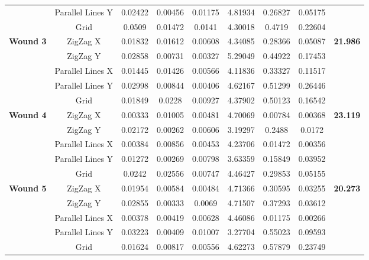 \begin{table}[htbp]
\begin{adjustbox}{width=1.2\textwidth,center=\textwidth}
\begin{tabular}{c|c|c|c|c|c|c|c|c}
         & Parallel Lines Y & 0.02422 & 0.00456 & 0.01175 & 4.81934 & 0.26827 & 0.05175 & \\
         & Grid & 0.0509 & 0.01472 & 0.0141 & 4.30018 & 0.4719 & 0.22604 & \\
         \midrule
         \multirow{5}{*}{\textbf{Wound 3}} & ZigZag X & 0.01832 & 0.01612 & 0.00608 & 4.34085 & 0.28366 & 0.05087 & \multirow{5}{*}{\textbf{21.986}}\\
         & ZigZag Y & 0.02858 & 0.00731 & 0.00327 & 5.29049 & 0.44922 & 0.17453 & \\
         & Parallel Lines X & 0.01445 & 0.01426 & 0.00566 & 4.11836 & 0.33327 & 0.11517 & \\
         & Parallel Lines Y & 0.02998 & 0.00844 & 0.00406 & 4.62167 & 0.51299 & 0.26446 &\\
         & Grid & 0.01849 & 0.0228 & 0.00927 & 4.37902 & 0.50123 & 0.16542 &\\
         \midrule
         \multirow{5}{*}{\textbf{Wound 4}} & ZigZag X & 0.00333 & 0.01005 & 0.00481 & 4.70069 & 0.00784 & 0.00368 & \multirow{5}{*}{\textbf{23.119}}\\
         & ZigZag Y & 0.02172 & 0.00262 & 0.00606 & 3.19297 & 0.2488 & 0.0172 & \\
         & Parallel Lines X & 0.00384 & 0.00856 & 0.00453 & 4.23706 & 0.01472 & 0.00356 & \\
         & Parallel Lines Y & 0.01272 & 0.00269 & 0.00798 & 3.63359 & 0.15849 & 0.03952 & \\
         & Grid & 0.0242 & 0.02556 & 0.00747 & 4.46427 & 0.29853 & 0.05155 &\\
         \midrule
         \multirow{5}{*}{\textbf{Wound 5}} & ZigZag X & 0.01954 & 0.00584 & 0.00484 & 4.71366 & 0.30595 & 0.03255 & \multirow{5}{*}{\textbf{20.273}}\\
         & ZigZag Y & 0.02855 & 0.00333 & 0.0069 & 4.71507 & 0.37293 & 0.03612 & \\
         & Parallel Lines X & 0.00378 & 0.00419 & 0.00628 & 4.46086 & 0.01175 & 0.00266 &\\
         & Parallel Lines Y & 0.03223 & 0.00409 & 0.01007 & 3.27704 & 0.55023 & 0.09593 & \\
         & Grid & 0.01624 & 0.00817 & 0.00556 & 4.62273 & 0.57879 & 0.23749 & \\
         \bottomrule
    \end{tabular}
    \label{tab:cartesian_impedance_tracking_rmse}
\end{adjustbox}
\end{table}

